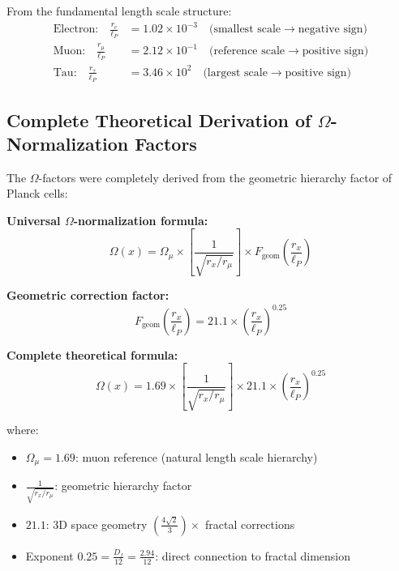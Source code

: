 \documentclass[12pt,a4paper]{article}
\numberwithin{equation}{section}
\newcommand{\Df}{D_f}
\newcommand{\lP}{\ell_P}
\newcommand{\Omegafactor}{\Omega}
\begin{document}
	From the fundamental length scale structure:
	\begin{align}
		\text{Electron:} \quad \frac{r_e}{\ell_P} &= 1.02 \times 10^{-3} \quad \text{(smallest scale} \rightarrow \text{negative sign)}\\
		\text{Muon:} \quad \frac{r_\mu}{\ell_P} &= 2.12 \times 10^{-1} \quad \text{(reference scale} \rightarrow \text{positive sign)}\\
		\text{Tau:} \quad \frac{r_\tau}{\ell_P} &= 3.46 \times 10^{2} \quad \text{(largest scale} \rightarrow \text{positive sign)}
		\label{eq:length_scales}
	\end{align}
	
	\subsection{Complete Theoretical Derivation of $\Omega$-Normalization Factors}
	
	The $\Omega$-factors were completely derived from the geometric hierarchy factor of Planck cells:
	
	\textbf{Universal $\Omegafactor$-normalization formula:}
	\begin{equation}
		\Omegafactor(x) = \Omegafactor_\mu \times \left[\frac{1}{\sqrt{r_x/r_\mu}}\right] \times F_{\text{geom}}\left(\frac{r_x}{\lP}\right)
		\label{eq:omega_universal}
	\end{equation}
	
	\textbf{Geometric correction factor:}
	\begin{equation}
		F_{\text{geom}}\left(\frac{r_x}{\lP}\right) = 21.1 \times \left(\frac{r_x}{\lP}\right)^{0.25}
		\label{eq:f_geom}
	\end{equation}
	
	\textbf{Complete theoretical formula:}
	\begin{equation}
		\Omegafactor(x) = 1.69 \times \left[\frac{1}{\sqrt{r_x/r_\mu}}\right] \times 21.1 \times \left(\frac{r_x}{\lP}\right)^{0.25}
		\label{eq:omega_complete}
	\end{equation}
	
	where:
	\begin{itemize}
		\item $\Omega_\mu = 1.69$: muon reference (natural length scale hierarchy)
		\item $\frac{1}{\sqrt{r_x/r_\mu}}$: geometric hierarchy factor
		\item $21.1$: 3D space geometry $\left(\frac{4\sqrt{2}}{3}\right) \times$ fractal corrections
		\item Exponent $0.25 = \frac{\Df}{12} = \frac{2.94}{12}$: direct connection to fractal dimension
	\end{itemize}
	
\end{document}
